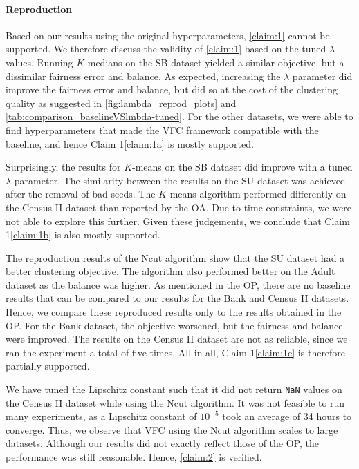 \paragraph{Reproduction} Based on our results using the original hyperparameters, \ref{claim:1} cannot be supported. We therefore discuss the validity of \ref{claim:1} based on the tuned $\lambda$ values. Running $K$-medians on the SB dataset yielded a similar objective, but a dissimilar fairness error and balance. As expected, increasing the $\lambda$ parameter did improve the fairness error and balance, but did so at the cost of the clustering quality as suggested in \autoref{fig:lambda_reprod_plots} and \autoref{tab:comparison_baselineVSlmbda-tuned}. For the other datasets, we were able to find hyperparameters that made the VFC framework compatible with the baseline, and hence Claim 1\ref{claim:1a} is mostly supported.

Surprisingly, the results for $K$-means on the SB dataset did improve with a tuned $\lambda$ parameter. The similarity between the results on the SU dataset was achieved after the removal of bad seeds. The $K$-means algorithm performed differently on the Census II dataset than reported by the OA. Due to time constraints, we were not able to explore this further. Given these judgements, we conclude that Claim 1\ref{claim:1b} is also mostly supported.

The reproduction results of the Ncut algorithm show that the SU dataset had a better clustering objective. The algorithm also performed better on the Adult dataset as the balance was higher. As mentioned in the OP, there are no baseline results that can be compared to our results for the Bank and Census II datasets. Hence, we compare these reproduced results only to the results obtained in the OP. For the Bank dataset, the objective worsened, but the fairness and balance were improved. The results on the Census II dataset are not as reliable, since we ran the experiment a total of five times. All in all, Claim 1\ref{claim:1c} is therefore partially supported.

We have tuned the Lipschitz constant such that it did not return \verb+NaN+ values on the Census II dataset while using the Ncut algorithm. It was not feasible to run many experiments, as a Lipschitz constant of $10^{-5}$ took an average of 34 hours to converge. Thus, we observe that VFC using the Ncut algorithm scales to large datasets. Although our results did not exactly reflect those of the OP, the performance was still reasonable. Hence, \ref{claim:2} is verified.

